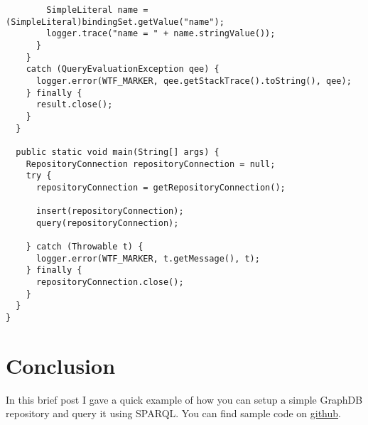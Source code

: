 \documentclass{amsart}
\begin{document}
\begin{small}
\begin{verbatim}
        SimpleLiteral name = (SimpleLiteral)bindingSet.getValue("name");
        logger.trace("name = " + name.stringValue());
      }
    }
    catch (QueryEvaluationException qee) {
      logger.error(WTF_MARKER, qee.getStackTrace().toString(), qee);
    } finally {
      result.close();
    }    
  }  
  
  public static void main(String[] args) {
    RepositoryConnection repositoryConnection = null;
    try {   
      repositoryConnection = getRepositoryConnection();
      
      insert(repositoryConnection);
      query(repositoryConnection);      
      
    } catch (Throwable t) {
      logger.error(WTF_MARKER, t.getMessage(), t);
    } finally {
      repositoryConnection.close();
    }
  }  
}
\end{verbatim}
\end{small}

\section{Conclusion}
    In this brief post I gave a quick example of how you can setup a simple GraphDB repository and query it using SPARQL. You can find sample code on
\href{http://}{github}.
  
  
  
 
\end{document}
